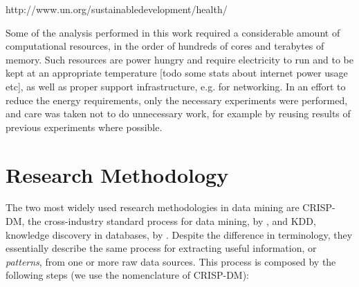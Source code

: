\documentclass[a4paper]{book}
\begin{document}
http://www.un.org/sustainabledevelopment/health/

Some of the analysis performed in this work required a considerable amount of computational resources, in the order of hundreds of cores and terabytes of memory. Such resources are power hungry and require electricity to run and to be kept at an appropriate temperature [todo some stats about internet power usage etc], as well as proper support infrastructure, e.g. for networking. In an effort to reduce the energy requirements, only the necessary experiments were performed, and care was taken not to do unnecessary work, for example by reusing results of previous experiments where possible.

\section{Research Methodology}
\label{sec:research_methodology}
The two most widely used research methodologies in data mining are CRISP-DM, the cross-industry standard process for data mining, by \cite{crispdm}, and KDD, knowledge discovery in databases, by \cite{kdd}. Despite the difference in terminology, they essentially describe the same process for extracting useful information, or \emph{patterns}, from one or more raw data sources. This process is composed by the following steps (we use the nomenclature of CRISP-DM):
\end{document}
